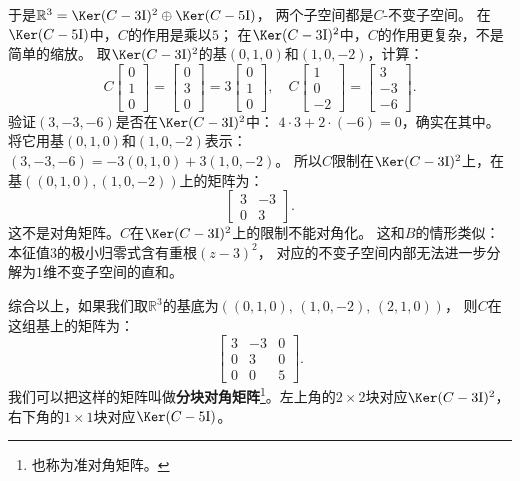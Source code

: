 \documentclass[12pt,UTF8]{ctexbook}
\begin{document}
于是$\mathbb{R}^3 = \Ker(C-3\mathrm{I})^2 \oplus \Ker(C-5\mathrm{I})$，
两个子空间都是$C$-不变子空间。
在$\Ker(C-5\mathrm{I})$中，$C$的作用是乘以$5$；
在$\Ker(C-3\mathrm{I})^2$中，$C$的作用更复杂，不是简单的缩放。
取$\Ker(C-3\mathrm{I})^2$的基$(0,1,0)$和$(1,0,-2)$，计算：
$$
C\begin{bmatrix} 0 \\ 1 \\ 0 \end{bmatrix} = \begin{bmatrix} 0 \\ 3 \\ 0 \end{bmatrix} = 3\begin{bmatrix} 0 \\ 1 \\ 0 \end{bmatrix},
\quad
C\begin{bmatrix} 1 \\ 0 \\ -2 \end{bmatrix} = \begin{bmatrix} 3 \\ -3 \\ -6 \end{bmatrix}.
$$
验证$(3,-3,-6)$是否在$\Ker(C-3\mathrm{I})^2$中：
$4\cdot 3 + 2\cdot(-6) = 0$，确实在其中。
将它用基$(0,1,0)$和$(1,0,-2)$表示：
$(3,-3,-6) = -3(0,1,0) + 3(1,0,-2)$。
所以$C$限制在$\Ker(C-3\mathrm{I})^2$上，在基$((0,1,0),(1,0,-2))$上的矩阵为：
$$
\begin{bmatrix} 3 & -3 \\ 0 & 3 \end{bmatrix}.
$$
这不是对角矩阵。$C$在$\Ker(C-3\mathrm{I})^2$上的限制不能对角化。
这和$B$的情形类似：本征值$3$的极小归零式含有重根$(z-3)^2$，
对应的不变子空间内部无法进一步分解为$1$维不变子空间的直和。

综合以上，如果我们取$\mathbb{R}^3$的基底为$((0,1,0),\, (1,0,-2),\, (2,1,0))$，
则$C$在这组基上的矩阵为：
$$
\begin{bmatrix} 3 & -3 & 0 \\ 0 & 3 & 0 \\ 0 & 0 & 5 \end{bmatrix}.
$$
我们可以把这样的矩阵叫做\textbf{分块对角矩阵}\footnote{也称为准对角矩阵。}。左上角的$2\times 2$块对应$\Ker(C-3\mathrm{I})^2$，右下角的$1\times 1$块对应$\Ker(C-5\mathrm{I})$。
\end{document}
